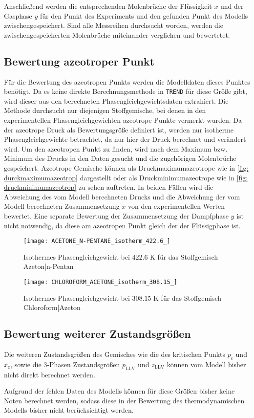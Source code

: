 \documentclass[../thesis.tex]{subfiles}
\begin{document}
Anschließend werden die entsprechenden Molenbrüche der Flüssigkeit $x$ und der Gasphase $y$ für den Punkt des Experiments und den gefunden Punkt des Modells zwischengespeichert. Sind alle Messreihen durchsucht worden, werden die zwischengespeicherten Molenbrüche miteinander verglichen und bewertetet.

\subsection{Bewertung azeotroper Punkt}

Für die Bewertung des azeotropen Punkts werden die Modelldaten dieses Punktes benötigt. Da es keine direkte Berechnungsmethode in \texttt{TREND} für diese Größe gibt, wird dieser aus den berechneten Phasengleichgewichtsdaten extrahiert. Die Methode durchsucht nur diejenigen Stoffgemische, bei denen in den experimentellen Phasengleichgewichten azeotrope Punkte vermerkt wurden. Da der azeotrope Druck als Bewertungsgröße definiert ist, werden nur isotherme Phasengleichgewichte betrachtet, da nur hier der Druck berechnet und verändert wird. Um den azeotropen Punkt zu finden, wird nach dem Maximum bzw. Minimum des Drucks in den Daten gesucht und die zugehörigen Molenbrüche gespeichert. Azeotrope Gemische können als Druckmaximumazeotrope wie in \autoref{fig: durckmaximumazeotrop} dargestellt oder als Druckminimumazeotrope wie in \autoref{fig: druckminimumazeotrop} zu sehen auftreten. In beiden Fällen wird die Abweichung des vom Modell berechneten Drucks und die Abweichung der vom Modell berechneten Zusammensetzung $x$ von den experimentellen Werten bewertet. Eine separate Bewertung der Zusammensetzung der Dampfphase $y$ ist nicht notwendig, da diese am azeotropen Punkt gleich der der Flüssigphase ist. 

\begin{figure}[htb]
	\centering
	\texttt{[image: ACETONE\_N-PENTANE\_isotherm\_422.6\_]}
	\caption{Isothermes Phasengleichgewicht bei $ 422$.$6$ K für das Stoffgemisch Azeton|n-Pentan}
	\label{fig: durckmaximumazeotrop}
\end{figure}

\begin{figure}[hbt]
	\centering
	\texttt{[image: CHLOROFORM\_ACETONE\_isotherm\_308.15\_]}
	\caption{Isothermes Phasengleichgewicht bei $ 308$.$15$ K für das Stoffgemisch Chloroform|Azeton}
	\label{fig: druckminimumazeotrop}
\end{figure}

\subsection{Bewertung weiterer Zustandsgrößen}

Die weiteren Zustandsgrößen des Gemisches wie die des kritischen Punkts $ p_{\mathrm{c}}$ und $ x_{\mathrm{c}}$, sowie die 3-Phasen Zustandsgrößen $p_{\mathrm{LLV}}$ und $z_{\mathrm{LLV}}$ können vom Modell bisher nicht direkt berechnet werden.

Aufgrund der fehlen Daten des Modells können für diese Größen bisher keine Noten berechnet werden, sodass diese in der Bewertung des thermodynamischen Modells bisher nicht berücksichtigt werden.
\end{document}
